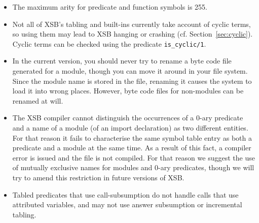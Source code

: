 \begin{itemize}
\item The maximum arity for predicate and function symbols is 255.
%
%
\item Not all of XSB's tabling and built-ins currently take account of
  cyclic terms, so using them may lead to XSB hanging or crashing
  (cf. Section~\ref{sec:cyclic}).  Cyclic terms can be checked using
  the predicate {\tt is\_cyclic/1}.
%
\item In the current version, you should never try to rename a byte code 
      file generated for a module, though you can move it around in your 
      file system.  Since the module name is stored in the file, renaming it
      causes the system to load it into wrong places.  However, byte code 
      files for non-modules can be renamed at will.
%
%
\item	The XSB compiler cannot distinguish the occurrences of a
      0-ary predicate and a name of a module (of an import declaration) as
      two different entities.  For that reason it fails to characterise the
      same symbol table entry as both a predicate and a module at the
      same time.  As a result of this fact, a compiler error is issued
      and the file is not compiled.  For that reason we suggest the
      use of mutually exclusive names for modules and 0-ary predicates,
      though we will try to amend this restriction in future versions of
      XSB.
%
\item Tabled predicates that use call-subsumption do not handle calls
  that use attributed variables, and may not use answer subsumption or
  incremental tabling.


\end{itemize}
